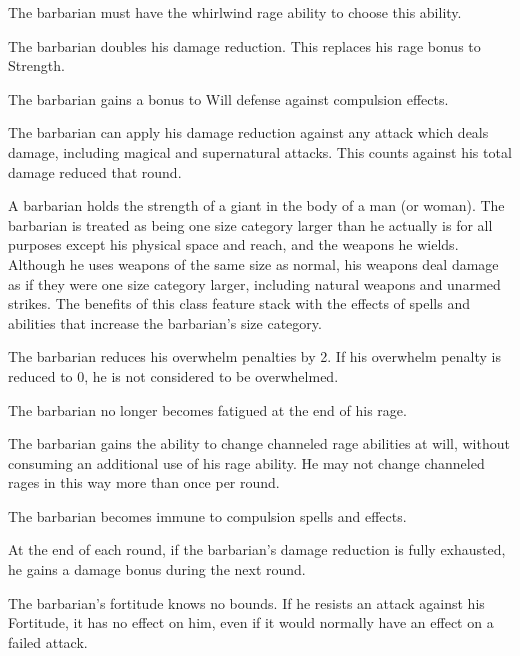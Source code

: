 The barbarian must have the whirlwind rage ability to choose this ability.

The barbarian doubles his damage reduction.
This replaces his rage bonus to Strength.

The barbarian gains a  bonus to Will defense against compulsion effects.

The barbarian can apply his damage reduction against any attack which deals damage, including magical and supernatural attacks.
This counts against his total damage reduced that round.

A barbarian holds the strength of a giant in the body of a man (or woman).
The barbarian is treated as being one size category larger than he actually is for all purposes except his physical space and reach, and the weapons he wields.
Although he uses weapons of the same size as normal, his weapons deal damage as if they were one size category larger, including natural weapons and unarmed strikes.
The benefits of this class feature stack with the effects of spells and abilities that increase the barbarian's size category.

The barbarian reduces his overwhelm penalties by 2.
If his overwhelm penalty is reduced to 0, he is not considered to be overwhelmed.

The barbarian no longer becomes fatigued at the end of his rage.

The barbarian gains the ability to change channeled rage abilities at will, without consuming an additional use of his rage ability.
He may not change channeled rages in this way more than once per round.

The barbarian becomes immune to compulsion spells and effects.

At the end of each round, if the barbarian's damage reduction is fully exhausted, he gains a  damage bonus during the next round.

The barbarian's fortitude knows no bounds.
If he resists an attack against his Fortitude, it has no effect on him, even if it would normally have an effect on a failed attack.

